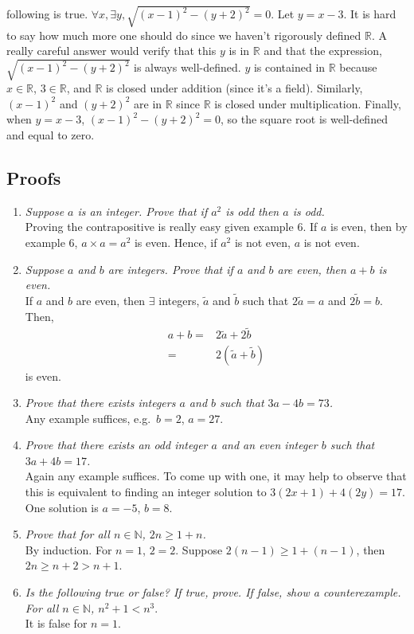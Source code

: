\documentclass[10pt]{article}
\begin{document}
\begin{enumerate}
{    following is true. $\forall x, \exists y, \sqrt{(x − 1)^2 − (y + 2)^2} = 0$.}
  Let $y=x-3$. It is hard to say how much more one should do since we
  haven't rigorously defined $\mathbb{R}$.  A really careful answer
  would verify that this $y$ is in $\mathbb{R}$ and that the
  expression, $\sqrt{(x − 1)^2 − (y + 2)^2}$ is always well-defined.  
  $y$ is contained in $\mathbb{R}$ because $x \in
  \mathbb{R}$, $3 \in \mathbb{R}$, and $\mathbb{R}$ is closed under
  addition (since it's a field).  Similarly, $(x-1)^2$ and $(y+2)^2$
  are in $\mathbb{R}$ since $\mathbb{R}$ is closed under
  multiplication. Finally, when $y=x-3$, $(x-1)^2 - (y+2)^2 = 0$, so
  the square root is well-defined and equal to zero.  
  \setcounter{savedcount}{\value{enumi}}
\end{enumerate}

\subsection{Proofs}

\begin{enumerate}
  \setcounter{enumi}{\value{savedcount}}
\item \textit{Suppose $a$ is an integer. Prove that if $a^2$ is odd then
    $a$ is odd.} \\
  Proving the contrapositive is really easy given example 6. If $a$ is
  even, then by example 6, $a \times a = a^2$ is even. Hence, if $a^2$
  is not even, $a$ is not even.
\item \textit{Suppose $a$ and $b$ are integers. Prove that if $a$ and
    $b$ are even, then $a + b$ is even.} \\
  If $a$ and $b$ are even, then $\exists$ integers, $\tilde{a}$ and
  $\tilde{b}$ such that $2 \tilde{a} = a$ and $2 \tilde{b} = b$. Then, 
  \begin{align*}
    a + b = & 2\tilde{a} + 2 \tilde{b} \\
    = & 2 (\tilde{a} + \tilde{b})
  \end{align*}
  is even.
\item \textit{Prove that there exists integers $a$ and $b$ such that $3a−4b =
    73$.} \\
  Any example suffices, e.g.\ $b = 2$, $a = 27$.
\item\textit{Prove that there exists an odd integer $a$ and an even integer $b$
    such that $3a + 4b = 17$.} \\
  Again any example suffices. To come up with one, it may help to 
  observe that this is equivalent to finding an integer solution to
  $3(2x+1) + 4(2y) = 17$. One solution is $a = -5$, $b=8$.
\item \textit{Prove that for all $n \in \mathbb{N}$, $2n \geq 1 + n$.} \\
  By induction. For $n=1$, $2 = 2$. Suppose $2(n-1) \geq 1 + (n-1)$,
  then $2n \geq n + 2 > n + 1$. 
\item \textit{Is the following true or false? If true, prove. If false, show a
    counterexample. For all $n \in \mathbb{N}$, $n^2 + 1 < n^3$}. \\
  It is false for $n=1$. 
\end{enumerate}
\end{document}
